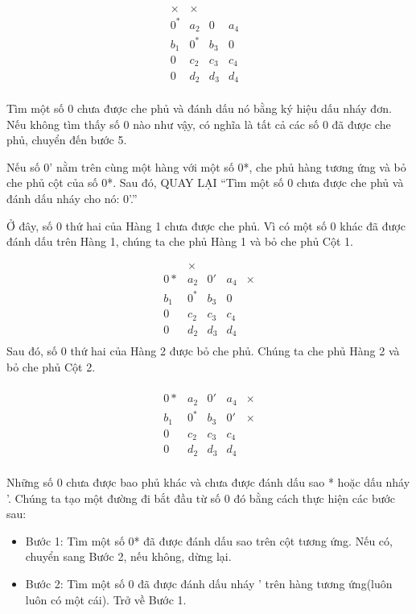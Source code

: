 \[
\begin{array}{ccccc}
\times & \times & & &\\
0^* & a_2 & 0 & a_4 &\\
b_1 & 0^* & b_3 & 0 &\\
0 & c_2 & c_3 & c_4 &\\
0 & d_2 & d_3 & d_4 &\\
\end{array}
\]

Tìm một số 0 chưa được che phủ và đánh dấu nó bằng ký hiệu dấu nháy đơn. Nếu không tìm thấy số 0 nào như vậy, có nghĩa là tất cả các số 0 đã được che phủ, chuyển đến bước 5.

Nếu số 0' nằm trên cùng một hàng với một số 0*, che phủ hàng tương ứng và bỏ che phủ cột của số 0*.  
Sau đó, QUAY LẠI ``Tìm một số 0 chưa được che phủ và đánh dấu nháy cho nó: 0'.''

Ở đây, số 0 thứ hai của Hàng 1 chưa được che phủ. Vì có một số 0 khác đã được đánh dấu trên Hàng 1, chúng ta che phủ Hàng 1 và bỏ che phủ Cột 1.  

\[
\begin{array}{ccccc}
& \times & &        &  \\
0* & a_2 & 0' & a_4 & \times\\
b_1 & 0^* & b_3 & 0 & \\
0 & c_2 & c_3 & c_4 & \\
0 & d_2 & d_3 & d_4 & \\
\end{array}
\]
Sau đó, số 0 thứ hai của Hàng 2 được bỏ che phủ. Chúng ta che phủ Hàng 2 và bỏ che phủ Cột 2.

\[
\begin{array}{ccccc}
& & & &   \\
0* & a_2 & 0' & a_4 & \times \\
b_1 & 0^* & b_3 & 0' & \times \\
0 & c_2 & c_3 & c_4 & \\
0 & d_2 & d_3 & d_4 & \\
\end{array}
\]

Những số 0 chưa được bao phủ khác và chưa được đánh dấu sao * hoặc dấu nháy '.
Chúng ta tạo một đường đi bắt đầu từ số 0 đó bằng cách thực hiện các bước sau:
\begin{itemize}
    \item Bước 1: Tìm một số 0* đã được đánh dấu sao trên cột tương ứng. Nếu có, chuyển sang Bước 2, nếu không, dừng lại.
    \item Bước 2: Tìm một số 0 đã được đánh dấu nháy ' trên hàng tương ứng(luôn luôn có một cái). Trở về Bước 1.
\end{itemize}

